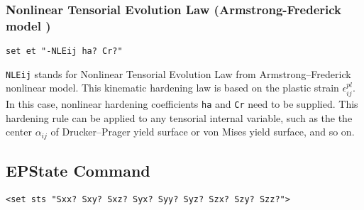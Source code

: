 \subsubsection{Nonlinear Tensorial Evolution Law (Armstrong-Frederick model )} 
\label{NLEij}
\begin{verbatim}
set et "-NLEij ha? Cr?" 
\end{verbatim}

\texttt{NLEij}  stands  for  Nonlinear Tensorial Evolution Law
from Armstrong--Frederick nonlinear model. This kinematic hardening law is
based on the plastic strain $\epsilon_{ij}^{pl}$. In this case,
nonlinear  hardening  coefficients  \texttt{ha}  and \texttt{Cr} need to be
supplied.  This  hardening rule can be applied to any tensorial
internal  variable,  such  as  the  the center $\alpha_{ij}$ of
Drucker--Prager yield surface or von Mises yield surface, and so
on.





\subsection{EPState Command}
\label{ep_Command}
\begin{verbatim}
<set sts "Sxx? Sxy? Sxz? Syx? Syy? Syz? Szx? Szy? Szz?"> 
\end{verbatim}

